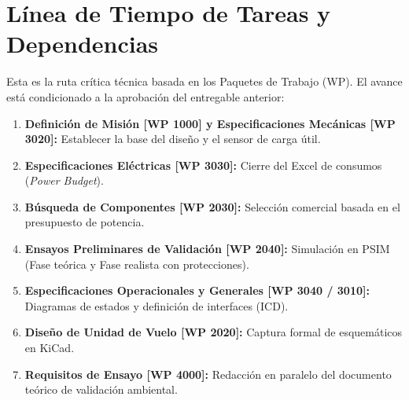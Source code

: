 \chapter{Línea de Tiempo de Tareas y Dependencias}

\noindent Esta es la ruta crítica técnica basada en los Paquetes de Trabajo (WP). El avance está condicionado a la aprobación del entregable anterior:

\begin{enumerate}
    \item \textbf{Definición de Misión [WP 1000] y Especificaciones Mecánicas [WP 3020]:} Establecer la base del diseño y el sensor de carga útil.
    \item \textbf{Especificaciones Eléctricas [WP 3030]:} Cierre del Excel de consumos (\textit{Power Budget}).
    \item \textbf{Búsqueda de Componentes [WP 2030]:} Selección comercial basada en el presupuesto de potencia.
    \item \textbf{Ensayos Preliminares de Validación [WP 2040]:} Simulación en PSIM (Fase teórica y Fase realista con protecciones).
    \item \textbf{Especificaciones Operacionales y Generales [WP 3040 / 3010]:} Diagramas de estados y definición de interfaces (ICD).
    \item \textbf{Diseño de Unidad de Vuelo [WP 2020]:} Captura formal de esquemáticos en KiCad.
    \item \textbf{Requisitos de Ensayo [WP 4000]:} Redacción en paralelo del documento teórico de validación ambiental.
\end{enumerate}
